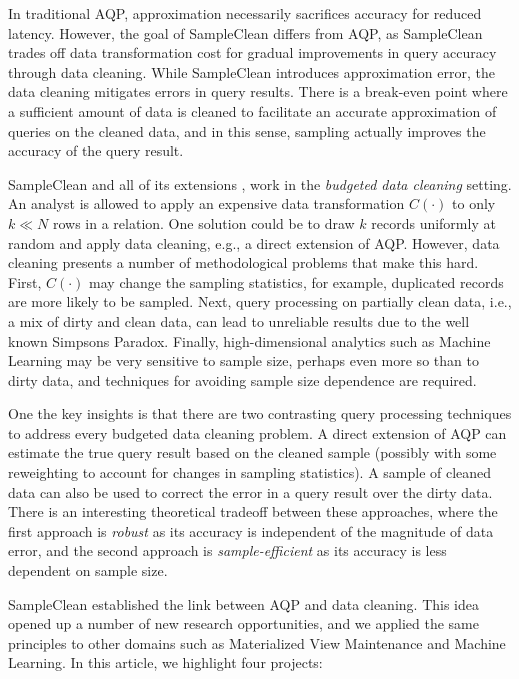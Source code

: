 In traditional AQP, approximation necessarily sacrifices accuracy for reduced latency. 
However, the goal of SampleClean differs from AQP, as SampleClean trades off data transformation cost for gradual improvements in query accuracy through data cleaning.
While SampleClean introduces approximation error, the data cleaning mitigates errors in query results.
There is a break-even point where a sufficient amount of data is cleaned to facilitate an accurate approximation of queries on the cleaned data, and in this sense, sampling actually improves the accuracy of the query result.

SampleClean \cite{wang1999sample} and all of its extensions \cite{krishnan2015svc}, work in the \emph{budgeted data cleaning} setting. 
An analyst is allowed to apply an expensive data transformation $C(\cdot)$ to only $k\ll N$ rows in a relation.
One solution could be to draw $k$ records uniformly at random and apply data cleaning, e.g., a direct extension of AQP.
However, data cleaning presents a number of methodological problems that make this hard.
First, $C(\cdot)$ may change the sampling statistics, for example, duplicated records are more likely to be sampled.
Next, query processing on partially clean data, i.e., a mix of dirty and clean data, can lead to unreliable results due to the well known Simpsons Paradox.
Finally, high-dimensional analytics such as Machine Learning may be very sensitive to sample size, perhaps even more so than to dirty data, and techniques for avoiding sample size dependence are required.

One the key insights is that there are two contrasting query processing techniques to address every budgeted data cleaning problem.
A direct extension of AQP can estimate the true query result based on the cleaned sample (possibly with some reweighting to account for changes in sampling statistics). 
A sample of cleaned data can also be used to correct the error in a query result over the dirty data.
There is an interesting theoretical tradeoff between these approaches, where the first approach is \emph{robust} as its accuracy is independent of the magnitude of data error, and the second approach is \emph{sample-efficient} as its accuracy is less dependent on sample size.

SampleClean established the link between AQP and data cleaning.
This idea opened up a number of new research opportunities, and we applied the same principles to other domains such as Materialized View Maintenance and Machine Learning.
In this article, we highlight four projects:

